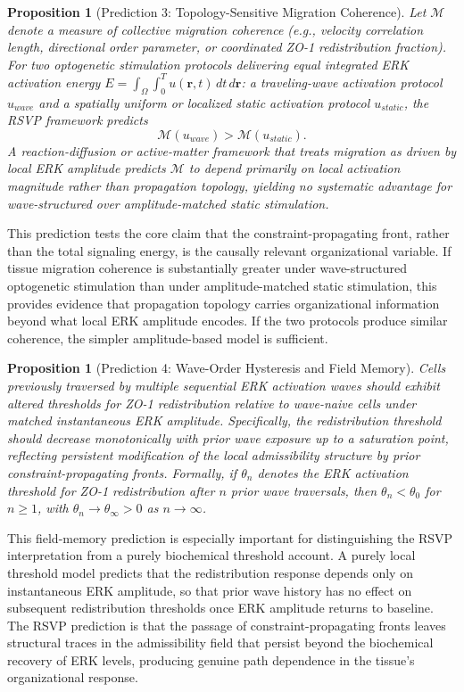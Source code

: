 \documentclass[11pt,a4paper]{article}
\theoremstyle{plain}
\newtheorem{proposition}[theorem]{Proposition}
\theoremstyle{definition}
\begin{document}
\begin{proposition}[Prediction 3: Topology-Sensitive Migration Coherence]
Let $\mathcal{M}$ denote a measure of collective migration coherence (e.g., velocity
correlation length, directional order parameter, or coordinated ZO-1 redistribution
fraction). For two optogenetic stimulation protocols delivering equal integrated ERK
activation energy $E = \int_\Omega \int_0^T u(\mathbf{r}, t)\, dt\, d\mathbf{r}$:
a traveling-wave activation protocol $u_{wave}$ and a spatially uniform or localized
static activation protocol $u_{static}$, the RSVP framework predicts
\[
\mathcal{M}(u_{wave}) > \mathcal{M}(u_{static}).
\]
A reaction-diffusion or active-matter framework that treats migration as driven by
local ERK amplitude predicts $\mathcal{M}$ to depend primarily on local activation
magnitude rather than propagation topology, yielding no systematic advantage for
wave-structured over amplitude-matched static stimulation.
\end{proposition}

This prediction tests the core claim that the constraint-propagating front, rather than
the total signaling energy, is the causally relevant organizational variable. If
tissue migration coherence is substantially greater under wave-structured optogenetic
stimulation than under amplitude-matched static stimulation, this provides evidence
that propagation topology carries organizational information beyond what local ERK
amplitude encodes. If the two protocols produce similar coherence, the simpler
amplitude-based model is sufficient.

\begin{proposition}[Prediction 4: Wave-Order Hysteresis and Field Memory]
Cells previously traversed by multiple sequential ERK activation waves should exhibit
altered thresholds for ZO-1 redistribution relative to wave-naive cells under matched
instantaneous ERK amplitude. Specifically, the redistribution threshold should decrease
monotonically with prior wave exposure up to a saturation point, reflecting persistent
modification of the local admissibility structure by prior constraint-propagating fronts.
Formally, if $\theta_n$ denotes the ERK activation threshold for ZO-1 redistribution
after $n$ prior wave traversals, then $\theta_n < \theta_0$ for $n \geq 1$, with
$\theta_n \to \theta_\infty > 0$ as $n \to \infty$.
\end{proposition}

This field-memory prediction is especially important for distinguishing the RSVP
interpretation from a purely biochemical threshold account. A purely local threshold
model predicts that the redistribution response depends only on instantaneous ERK
amplitude, so that prior wave history has no effect on subsequent redistribution
thresholds once ERK amplitude returns to baseline. The RSVP prediction is that the
passage of constraint-propagating fronts leaves structural traces in the admissibility
field that persist beyond the biochemical recovery of ERK levels, producing genuine
path dependence in the tissue's organizational response.
\end{document}
